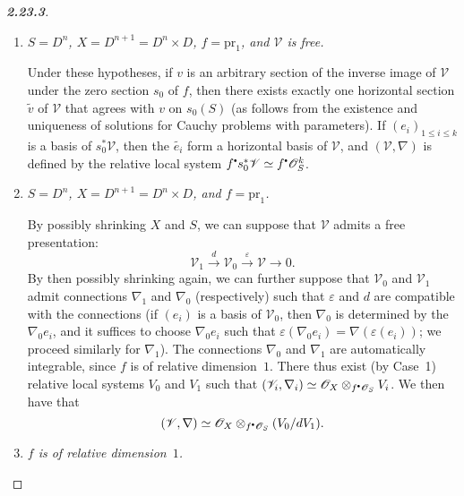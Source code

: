\documentclass{report}
\theoremstyle{plain}
\theoremstyle{definition}
\newcommand{\sh}[1]{{\mathscr{#1}}}
\newcommand{\sbullet}{{\mathbin{\vcenter{\hbox{\scalebox{.5}{$\bullet$}}}}}}
\newcommand{\pr}{\mathrm{pr}}
\renewcommand{\leq}{\leqslant}
\newcommand{\oldpage}[1]{\marginpar{\footnotesize$\Big\vert$ \textit{p.~#1}}}
\begin{document}
\begin{proof}[\normalfont\textbf{2.23.3}]
  \begin{enumerate}[\bf {Case}~1:]
    \item \emph{$S=D^n$, $X=D^{n+1}=D^n\times D$, $f=\pr_1$, and $\sh{V}$ is free.}

      Under these hypotheses, if $v$ is an arbitrary section of the inverse image of $\sh{V}$ under the zero section $s_0$ of $f$, then there exists exactly one horizontal section $\widetilde{v}$ of $\sh{V}$ that agrees with $v$ on $s_0(S)$ (as follows from the existence and uniqueness of solutions for Cauchy problems with parameters).
      If $(e_i)_{1\leq i\leq k}$ is a basis of $s_0^*\sh{V}$, then the $\widetilde{e_i}$ form a horizontal basis of $\sh{V}$, and $(\sh{V},{\nabla})$ is defined by the relative local system $f^\sbullet s_0^*\sh{V}\simeq f^\sbullet\sh{O}_S^k$.
    \item \emph{$S=D^n$, $X=D^{n+1}=D^n\times D$, and $f=\pr_1$.}

      By possibly shrinking $X$ and $S$, we can suppose that $\sh{V}$ admits a free presentation:
      \[
        \sh{V}_1 \xrightarrow{d} \sh{V}_0 \xrightarrow{\varepsilon} \sh{V} \to 0.
      \]
      By then possibly shrinking again, we can further suppose that $\sh{V}_0$ and $\sh{V}_1$ admit connections $\nabla_1$ and $\nabla_0$ (respectively) such that $\varepsilon$ and $d$ are compatible with the connections (if $(e_i)$ is a basis of $\sh{V}_0$, then $\nabla_0$ is determined by the $\nabla_0 e_i$, and it suffices to choose $\nabla_0 e_i$ such that $\varepsilon(\nabla_0 e_i)=\nabla(\varepsilon(e_i))$; we proceed similarly for $\nabla_1$).
      The connections $\nabla_0$ and $\nabla_1$ are automatically integrable, since $f$ is of relative dimension~$1$.
      There thus exist (by Case~1) relative local systems $V_0$ and $V_1$ such that $(\sh{V}_i,\nabla_i)\simeq\sh{O}_X\otimes_{f^\sbullet\sh{O}_S}V_i$.
      We then have that
      \[
        (\sh{V},\nabla) \simeq \sh{O}_X\otimes_{f^\sbullet\sh{O}_S}(V_0/dV_1).
      \]
\oldpage{18}
    \item \emph{$f$ is of relative dimension~$1$.}


\end{enumerate}
\end{proof}
\end{document}
